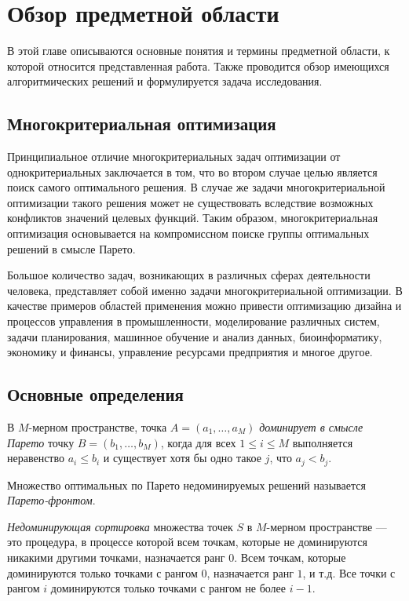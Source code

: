 \chapter{Обзор предметной области}
В этой главе описываются основные понятия и термины предметной области, к которой относится представленная работа. Также проводится обзор имеющихся алгоритмических решений и формулируется задача исследования.

\section{Многокритериальная оптимизация}
Принципиальное отличие многокритериальных задач оптимизации от однокритериальных заключается в том, что во втором случае целью является поиск самого оптимального решения.
В случае же задачи многокритериальной оптимизации такого решения может не существовать вследствие возможных конфликтов значений целевых функций.
Таким образом, многокритериальная оптимизация основывается на компромиссном поиске группы оптимальных решений в смысле Парето.

Большое количество задач, возникающих в различных сферах деятельности человека, представляет собой именно задачи многокритериальной оптимизации.
В качестве примеров областей применения можно привести оптимизацию дизайна и процессов управления в промышленности, моделирование различных систем, задачи планирования, машинное обучение и анализ данных, биоинформатику, экономику и финансы, управление ресурсами предприятия и многое другое.

\section{Основные определения}
\begin{definition}
    В $M$-мерном пространстве, точка $A = (a_1, \ldots, a_M)$ \textit{доминирует в смысле Парето} точку $B = (b_1, \ldots, b_M)$, когда для всех $1 \leq i \leq M$ выполняется неравенство $a_i \leq b_i$ и существует хотя бы одно такое $j$, что $a_j < b_j$.
\end{definition}
\begin{definition}
    Множество оптимальных по Парето недоминируемых решений называется \textit{Парето-фронтом}.
\end{definition}
\begin{definition}
\textit{Недоминирующая сортировка} множества точек $S$ в $M$-мерном пространстве --- это процедура, в процессе которой всем точкам, которые не доминируются никакими другими точками, назначается ранг $0$.
Всем точкам, которые доминируются только точками с рангом $0$, назначается ранг $1$, и т.д.
Все точки с рангом $i$ доминируются только точками с рангом не более $i - 1$.
\end{definition}

